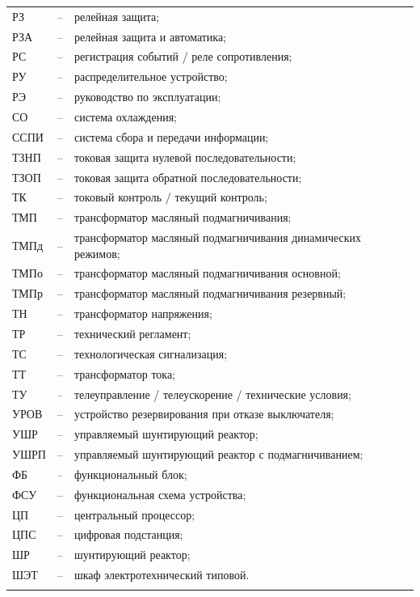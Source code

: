 \begin{longtable}{>{\raggedright\arraybackslash}m{2cm}>{\raggedright\arraybackslash}m{0.5cm}>{\raggedright\arraybackslash}m{20cm}}
РЗ & -- & релейная защита; \\
РЗА & -- & релейная защита и автоматика; \\
РС & -- & регистрация событий / реле сопротивления; \\
РУ & -- & распределительное устройство; \\
РЭ & -- & руководство по эксплуатации; \\
СО & -- & система охлаждения; \\
ССПИ & -- & система сбора и передачи информации; \\
ТЗНП & -- & токовая защита нулевой последовательности; \\
ТЗОП & -- & токовая защита обратной последовательности; \\
ТК & -- & токовый контроль / текущий контроль; \\
ТМП & -- & трансформатор масляный подмагничивания; \\
ТМПд & -- & трансформатор масляный подмагничивания динамических режимов; \\
ТМПо & -- & трансформатор масляный подмагничивания основной; \\
ТМПр & -- & трансформатор масляный подмагничивания резервный; \\
ТН & -- & трансформатор напряжения; \\
ТР & -- & технический регламент; \\
ТС & -- & технологическая сигнализация; \\
ТТ & -- & трансформатор тока; \\
ТУ & -- & телеуправление / телеускорение / технические условия; \\
УРОВ & -- & устройство резервирования при отказе выключателя; \\
УШР & -- & управляемый шунтирующий реактор; \\
УШРП & -- & управляемый шунтирующий реактор с подмагничиванием; \\
ФБ & -- & функциональный блок; \\
ФСУ & -- & функциональная схема устройства; \\
ЦП & -- & центральный процессор; \\
ЦПС & -- & цифровая подстанция; \\
ШР & -- & шунтирующий реактор; \\
ШЭТ & -- & шкаф электротехнический типовой. \\
{\color{white}\fontsize{0.1pt}{0.1pt}\selectfont<endABBRS>}
\end{longtable}
